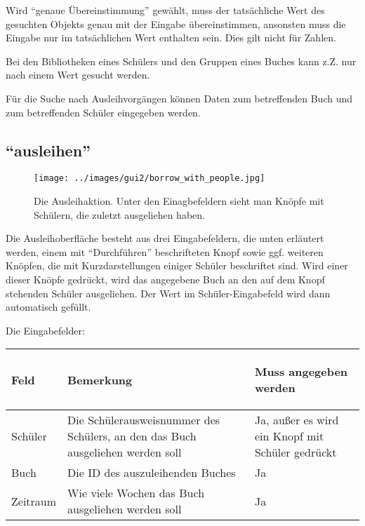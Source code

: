 Wird ``genaue Übereinstimmung'' gewählt, muss der tatsächliche Wert des gesuchten Objekts genau mit der Eingabe übereinstimmen, ansonsten muss die Eingabe nur im tatsächlichen Wert enthalten sein. Dies gilt nicht für Zahlen.

Bei den Bibliotheken eines Schülers und den Gruppen eines Buches kann z.Z. nur nach einem Wert gesucht werden.

Für die Suche nach Ausleihvorgängen können Daten zum betreffenden Buch und zum betreffenden Schüler eingegeben werden.


\subsection{``ausleihen''}
\label{subsec:detail:borrow}
\begin{figure}\texttt{[image: ../images/gui2/borrow\_with\_people.jpg]}\caption{Die Ausleihaktion. Unter den Einagbefeldern sieht man Knöpfe mit Schülern, die zuletzt ausgeliehen haben.}\label{fig:borrow_with_people}\end{figure}

Die Ausleihoberfläche besteht aus drei Eingabefeldern, die unten erläutert werden, einem mit ``Durchführen'' beschrifteten Knopf sowie ggf. weiteren Knöpfen, die mit Kurzdarstellungen einiger Schüler beschriftet sind.
Wird einer dieser Knöpfe gedrückt, wird das angegebene Buch an den auf dem Knopf stehenden Schüler ausgeliehen. Der Wert im Schüler-Eingabefeld wird dann automatisch gefüllt.

Die Eingabefelder:

\begin{tabular}{|p{}|p{}|p{}|}\hline
\begin{center}Feld\end{center} & \begin{center}Bemerkung\end{center} & \begin{center}Muss angegeben werden\end{center}\\
\hline
Schüler & Die Schülerausweisnummer des Schülers, an den das Buch ausgeliehen werden soll & Ja, außer es wird ein Knopf mit Schüler gedrückt\\
\hline
Buch & Die ID des auszuleihenden Buches & Ja\\
\hline
Zeitraum & Wie viele Wochen das Buch ausgeliehen werden soll & Ja\\
\hline
\end{tabular}

